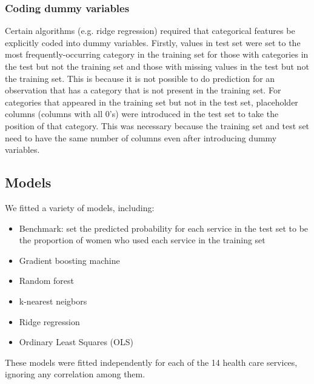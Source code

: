 \documentclass{article}\usepackage[]{graphicx}\usepackage[]{color}
\begin{document}
\subsubsection{Coding dummy variables}
Certain algorithms (e.g. ridge regression) required that categorical features be explicitly coded into dummy variables. Firstly, values in test set were set to the most frequently-occurring category in the training set for those with categories in the test but not the training set and those with missing values in the test but not the training set. This is because it is not possible to do prediction for an observation that has a category that is not present in the training set. For categories that appeared in the training set but not in the test set, placeholder columns (columns with all 0's) were introduced in the test set to take the position of that category. This was necessary because the training set and test set need to have the same number of columns even after introducing dummy variables.

\subsection{Models}
We fitted a variety of models, including:                                                                                                                                                                                                                                                                                                                                                                                                                                                                                                                                                                                                \begin{itemize}
\item Benchmark: set the predicted probability for each service in the test set to be the proportion of women who used each service in the training set
 \item Gradient boosting machine
 \item Random forest
 \item k-nearest neigbors
 \item Ridge regression
 \item Ordinary Least Squares (OLS)
 \end{itemize}

These models were fitted independently for each of the 14 health care services, ignoring any correlation among them.
\end{document}
